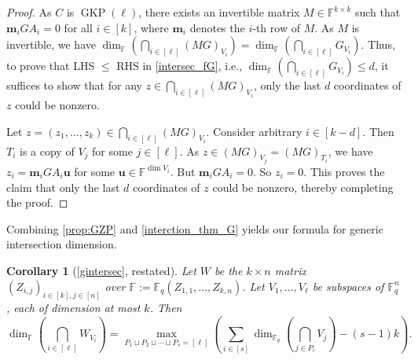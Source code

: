 \documentclass[11pt]{article}
\newif\ifmynotes
\newcommand{\ZZnote}[1]{\ifmynotes\textcolor{violet}{[Zihan: #1]}\else\fi}
\theoremstyle{plain}
\newtheorem{cor}[thm]{Corollary}
\theoremstyle{definition}
\theoremstyle{remark}
\newcommand{\F}{\mathbb{F}}
\newcommand{\bu}{\bm{u}}
\newcommand{\vm}{\bm{m}}
\begin{document}
\begin{proof}
As $C$ is $\operatorname{GKP}(\ell)$, there exists an invertible matrix $M\in \F^{k\times k}$ such that $\vm_i GA_i=0$ for all $i\in[k]$, where $\vm_i$ denotes the $i$-th row of $M$. As $M$ is invertible, we have $\dim_{\F}\left(\bigcap_{i\in[\ell]}(MG)_{V_i}\right)=\dim_{\F}\left(\bigcap_{i\in[\ell]}G_{V_i}\right)$.
Thus, to prove that LHS $\leq$ RHS in \eqref{intersec_fG}, i.e., $\dim_{\F}\left(\bigcap_{i\in[\ell]}G_{V_i}\right)\leq d$, it suffices to show that for any $z\in\bigcap_{i\in[\ell]}(MG)_{V_i}$, only the last $d$ coordinates of $z$ could be nonzero. 

Let $z=(z_1,\dots,z_k)\in\bigcap_{i\in[\ell]}(MG)_{V_i}$. Consider arbitrary $i\in [k-d]$. Then $T_i$ is a copy of $V_j$ for some $j\in [\ell]$. As $z\in (MG)_{V_j}=(MG)_{T_i}$, we have $z_i=\vm_i GA_i\bu$ for some $\bu\in \F^{\dim V_i}$.
But $\vm_i GA_i=0$. So $z_i=0$. This proves the claim that only the last $d$ coordinates of $z$ could be nonzero, thereby completing the proof. 
\end{proof}


Combining \cref{prop:GZP} and \cref{interction_thm_G} yields our formula for generic intersection dimension.

\begin{cor}[\cref{gintersec}, restated]
Let $W$ be the $k\times n$ matrix $(Z_{i,j})_{i\in [k], j\in [n]}$ over $\F:=\F_q(Z_{1,1},\dots,Z_{k,n})$.
Let $V_1,\dots,V_\ell$ be subspaces of $\F_q^n$, each of dimension at most $k$. Then
\begin{equation}\label{intersec1}
\dim_{\mathbb{F}}\left(\bigcap_{i\in[\ell]}W_{V_i}\right)=\max_{P_1\sqcup P_2\sqcup \cdots\sqcup P_s=[\ell]}\left(\sum_{i\in[s]}\dim_{\F_q}\left(\bigcap_{j\in P_i}V_j\right)-(s-1)k\right).
\end{equation} 
\end{cor}

\end{document}
